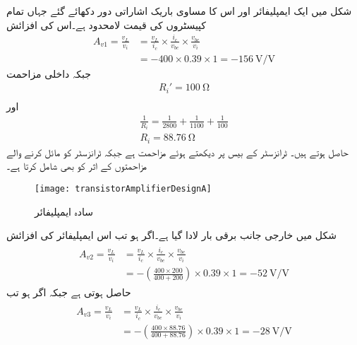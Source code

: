 
شکل  میں ایک ایمپلیفائر اور اس کا مساوی باریک اشاراتی دور دکھائے گئے جہاں تمام کپیسٹروں کی قیمت لامحدود ہے۔اس کی افزائش
\begin{align*}
A_{v1}=\frac{v_L}{v_i}&=\frac{v_L}{i_c} \times \frac{i_c}{v_{be}} \times \frac{v_{be}}{v_i}\\
&=-400 \times 0.39 \times 1=\SI[per=frac,fraction=nice]{-156}{\volt \per \volt}
\end{align*}
جبکہ داخلی مزاحمت 
\begin{align*}
R_i'=\SI{100}{\ohm}\\
\end{align*}
اور 
\begin{align*}
\frac{1}{R_i}=\frac{1}{2800}+\frac{1}{1100}+\frac{1}{100}\\
R_i=\SI{88.76}{\ohm}
\end{align*}
حاصل ہوتے ہیں۔ ٹرانزسٹر کے بیس پر دیکھتے ہوئے مزاحمت ہے جبکہ  ٹرانزسٹر کو مائل کرنے والے مزاحمتوں کے اثر کو بھی شامل کرتا ہے۔
%
\begin{figure}
\centering
\texttt{[image: transistorAmplifierDesignA]}
\caption{سادہ ایمپلیفائر}
\label{شکل_سادہ_ایمپلیفائر_بار_کے_اثرات_الف}
\end{figure}
شکل  میں خارجی جانب برقی بار  لادا گیا ہے۔اگر  ہو تب اس ایمپلیفائر کی افزائش
\begin{gather}
\begin{aligned}\label{مساوات_ٹرانزسٹر_بار_کا_افزائش_پر_اثر_الف}
A_{v2}=\frac{v_L}{v_i}&=\frac{v_L}{i_c} \times \frac{i_c}{v_{be}} \times \frac{v_{be}}{v_i}\\
&=-\left(\frac{400 \times 200}{400+200} \right) \times 0.39 \times 1=\SI[per=frac,fraction=nice]{-52}{\volt \per \volt}
\end{aligned}
\end{gather}
حاصل ہوتی ہے جبکہ اگر  ہو تب
\begin{gather}
\begin{aligned}\label{مساوات_ٹرانزسٹر_بار_کا_افزائش_پر_اثر_ب}
A_{v3}=\frac{v_L}{v_i}&=\frac{v_L}{i_c} \times \frac{i_c}{v_{be}} \times \frac{v_{be}}{v_i}\\
&=-\left(\frac{400 \times 88.76}{400+88.76} \right) \times 0.39 \times 1=\SI[per=frac,fraction=nice]{-28}{\volt \per \volt}
\end{aligned}
\end{gather}
